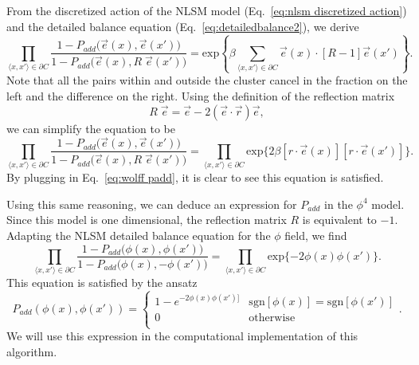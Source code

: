 \documentclass[12pt]{report}
\newcommand{\e}{\vec e}
\begin{document}
From the discretized action of the NLSM model (Eq.~\ref{eq:nlsm discretized action}) and the detailed balance equation (Eq.~\ref{eq:detailedbalance2}), we derive
\begin{equation}
    \prod_{\langle x,x'\rangle \in \partial C}  \frac{ 1 - P_{add}\big(\e(x),\e(x')\big)}{ 1 - P_{add}\big(\e(x),R\;\e(x')\big)}  = \mathrm{exp}\left\{\beta\sum_{\langle x,x'\rangle \in \partial C} \e(x)\cdot[R-1]\e(x')\right\}.
\end{equation}
Note that all the pairs within and outside the cluster cancel in the fraction on the left and the difference on the right. Using the definition of the reflection matrix
\begin{equation}
    R\;\e = \e - 2(\e\cdot\vec{r})\e,
\end{equation}
we can simplify the equation to be 
\begin{equation}
    \prod_{\langle x,x'\rangle \in \partial C}  \frac{ 1 - P_{add}\big(\e(x),\e(x')\big)}{ 1 - P_{add}\big(\e(x),R\;\e(x')\big)}  = \prod_{\langle x,x'\rangle \in \partial C}\mathrm{exp}\big\{2\beta[r\cdot\e(x)][r\cdot\e(x')]\big\}.
\end{equation}
By plugging in Eq.~\ref{eq:wolff padd}, it is clear to see this equation is satisfied.

Using this same reasoning, we can deduce an expression for $P_{add}$ in the $\phi^4$ model. Since this model is one dimensional, the reflection matrix $R$ is equivalent to $-1$. Adapting the NLSM detailed balance equation for the $\phi$ field, we find
\begin{equation}
    \prod_{\langle x,x'\rangle \in \partial C}  \frac{ 1 - P_{add}\big(\phi(x),\phi(x')\big)}{ 1 - P_{add}\big(\phi(x),-\phi(x')\big)}  = \prod_{\langle x,x'\rangle \in \partial C}\mathrm{exp}\{-2 \phi(x)\phi(x')\}.
\end{equation}
This equation is satisfied by the ansatz
\begin{equation}
    \label{eq:wolff padd}
    P_{add}(\phi(x),\phi(x')) = \begin{cases} 
        1 - e^{-2\phi(x)\phi(x')]} & \mathrm{sgn}[\phi(x)]=\mathrm{sgn}[\phi(x')]\\
        0 & \mathrm{otherwise} \\
   \end{cases}.
\end{equation}
We will use this expression in the computational implementation of this algorithm.
\end{document}
